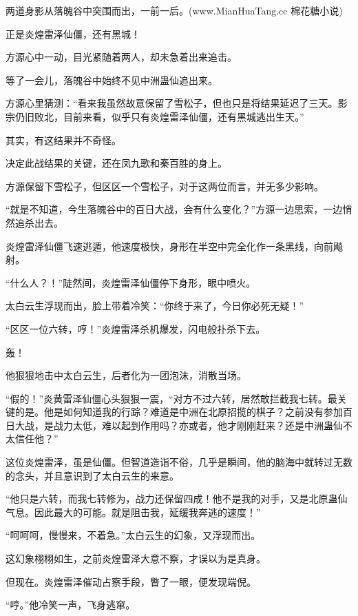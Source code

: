
\begin{this_body}

两道身影从落魄谷中突围而出，一前一后。(www.MianHuaTang.cc 棉花糖小说)

正是炎煌雷泽仙僵，还有黑城！

方源心中一动，目光紧随着两人，却未急着出来追击。

等了一会儿，落魄谷中始终不见中洲蛊仙追出来。

方源心里猜测：“看来我虽然故意保留了雪松子，但也只是将结果延迟了三天。影宗仍旧败北，目前来看，似乎只有炎煌雷泽仙僵，还有黑城逃出生天。”

其实，有这结果并不奇怪。

决定此战结果的关键，还在凤九歌和秦百胜的身上。

方源保留下雪松子，但区区一个雪松子，对于这两位而言，并无多少影响。

“就是不知道，今生落魄谷中的百日大战，会有什么变化？”方源一边思索，一边悄然追杀出去。

炎煌雷泽仙僵飞速逃遁，他速度极快，身形在半空中完全化作一条黑线，向前飚射。

“什么人？！”陡然间，炎煌雷泽仙僵停下身形，眼中喷火。

太白云生浮现而出，脸上带着冷笑：“你终于来了，今日你必死无疑！”

“区区一位六转，哼！”炎煌雷泽杀机爆发，闪电般扑杀下去。

轰！

他狠狠地击中太白云生，后者化为一团泡沫，消散当场。

“假的！”炎黄雷泽仙僵心头狠狠一震，“对方不过六转，居然敢拦截我七转。最关键的是。他是如何知道我的行踪？难道是中洲在北原招揽的棋子？之前没有参加百日大战，是战力太低，难以起到作用吗？亦或者，他才刚刚赶来？还是中洲蛊仙不太信任他？”

这位炎煌雷泽，虽是仙僵。但智道造诣不俗，几乎是瞬间，他的脑海中就转过无数的念头，并且意识到了太白云生的来意。

“他只是六转，而我七转修为，战力还保留四成！他不是我的对手，又是北原蛊仙气息。因此最大的可能。就是阻击我，延缓我奔逃的速度！”

“呵呵呵，慢慢来，不着急。”太白云生的幻象，又浮现而出。

这幻象栩栩如生，之前炎煌雷泽大意不察，才误以为是真身。

但现在。炎煌雷泽催动占察手段，瞥了一眼，便发现端倪。

“哼。”他冷笑一声，飞身逃窜。


\end{this_body}
